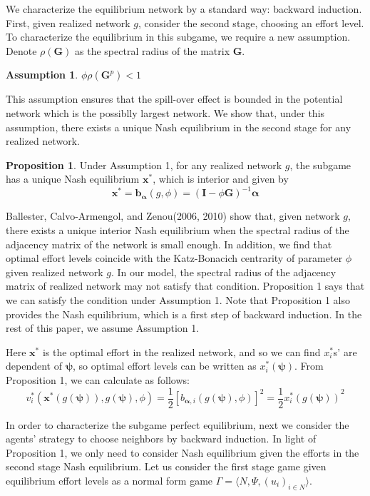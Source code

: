 \documentclass[12pt]{article}
\theoremstyle{definition}
\newtheorem{proposition}{Proposition}
\newtheorem{assumption}{Assumption}
\begin{document}
We characterize the equilibrium network by a standard way: backward induction.
First, given realized network $g$, consider the second stage, choosing an effort level.
To characterize the equilibrium in this subgame, we require a new assumption.
Denote $\rho (\bm{G})$ as the spectral radius of the matrix $\bm{G}$.

\begin{assumption}
$\phi \rho(\bm{G}^p) < 1$
\end{assumption}

This assumption ensures that the spill-over effect is bounded in the potential network which is the possiblly largest network.
We show that, under this assumption, there exists a unique Nash equilibrium in the second stage for any realized network.

\begin{proposition}
Under Assumption 1, for any realized network $g$, the subgame has a unique Nash equilibrium $\bm{x}^*$, which is interior and given by
\[ \bm{x}^* = \bm{b}_{\bm{\alpha}}(g, \phi) = {(\bm{I} - \phi \bm{G})}^{-1} \bm{\alpha} \]
\end{proposition}

Ballester, Calvo-Armengol, and Zenou(2006, 2010) show that, given network $g$, there exists a unique interior Nash equilibrium when the spectral radius of the adjacency matrix of the network is small enough.
In addition, we find that optimal effort levels coincide with the Katz-Bonacich centrarity of parameter $\phi$ given realized network $g$.
In our model, the spectral radius of the adjacency matrix of realized network may not satisfy that condition.
Proposition 1 says that we can satisfy the condition under Assumption 1.
Note that Proposition 1 also provides the Nash equilibrium, which is a first step of backward induction.
In the rest of this paper, we assume Assumption 1.

Here $\bm{x}^*$ is the optimal effort in the realized network, and so we can find $x_i^*$s' are dependent of $\bm{\psi}$, so optimal effort levels can be written as $x_i^*(\bm{\psi})$.
From Proposition 1, we can calculate as follows:
\begin{equation}
	\label{opteff}
	v_i^*(\bm{x}^*(g(\bm{\psi})), g(\bm{\psi}), \phi) = \frac{1}{2} {[b_{\bm{\alpha}, i}(g(\bm{\psi}), \phi)]}^2 = \frac{1}{2} {x_i^*(g(\bm{\psi}))}^2
\end{equation}

In order to characterize the subgame perfect equilibrium, next we consider the agents' strategy to choose neighbors by backward induction.
In light of Proposition 1, we only need to consider Nash equilibrium given the efforts in the second stage Nash equilibrium.
Let us consider the first stage game given equilibrium effort levels as a normal form game $\Gamma = \langle N, \Psi, {(u_i)}_{i \in N} \rangle$.
\end{document}
